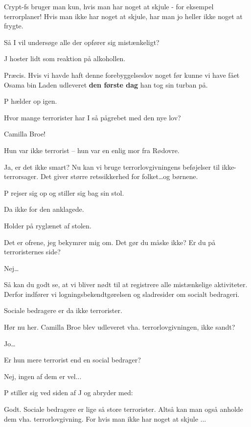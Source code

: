 \documentclass[a4paper,11pt]{article}
\begin{document}
\begin{sketch}
Crypt-fs bruger man kun, hvis man har noget at skjule - for
eksempel terrorplaner! Hvis man ikke har noget at skjule, har man
jo heller ikke noget at frygte.

Så I vil undersøge alle der opfører sig mistænkeligt?

\scene J hoster lidt som reaktion på alkohollen.

Præcis. Hvis vi havde haft denne forebyggelseslov noget før
kunne vi have fået Osama bin Laden udleveret \textbf{den første dag}
han tog sin turban på.

\scene P hælder op igen.

Hvor mange terrorister har I så pågrebet med den nye lov?

Camilla Broe!

Hun var ikke terrorist -- hun var en enlig mor fra Rødovre.

Ja, er det ikke smart? Nu kan vi bruge terrorlovgivningens
beføjelser til ikke-terrorsager. Det giver større retssikkerhed for
folket\ldots og børnene.

\scene P rejser sig op og stiller sig bag sin stol.

Da ikke for den anklagede.

\scene Holder på ryglænet af stolen.

Det er ofrene, jeg bekymrer mig om. Det gør du måske ikke? Er
du på terroristernes side?

Nej\ldots


Så kan du godt se, at vi bliver nødt til at registrere alle
mistænkelige aktiviteter. Derfor indfører vi logningsbekendtgørelsen
og sladresider om socialt bedrageri.

Sociale bedragere er da ikke terrorister.

Hør nu her. Camilla Broe blev udleveret vha. terrorlovgivningen, ikke sandt?

Jo\ldots


Er hun mere terrorist end en social bedrager?

Nej, ingen af dem er vel...

\scene P stiller sig ved siden af J og abryder med:


Godt. Sociale bedragere er lige så store terrorister. Altså
kan man også anholde dem vha. terrorlovgivning. For hvis man ikke har
noget at skjule ...


\end{sketch}
\end{document}
